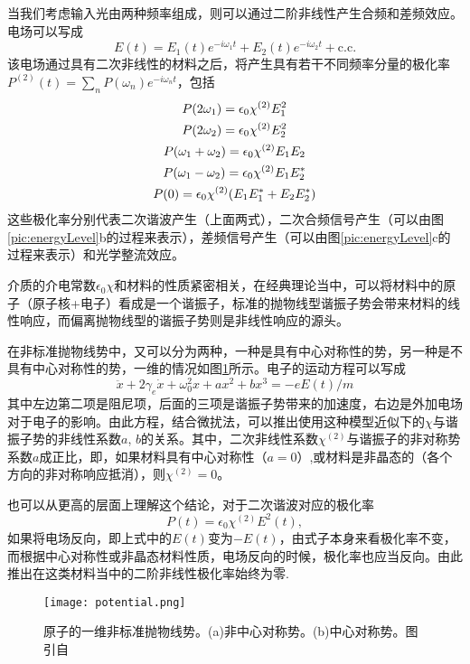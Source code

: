 当我们考虑输入光由两种频率组成，则可以通过二阶非线性产生合频和差频效应。电场可以写成
\begin{equation}
E(t) = E_1(t)e^{-i\omega_1 t}+E_2(t)e^{-i\omega_2 t}+\textrm{c.c.}
\end{equation}
该电场通过具有二次非线性的材料之后，将产生具有若干不同频率分量的极化率$P^{(2)}(t) = \sum_n P(\omega_n)e^{-i\omega_nt}$，包括
\begin{gather}
P(2\omega_1) = \epsilon_0\chi^{(2)}E_1^2  \notag \\
P(2\omega_2) = \epsilon_0\chi^{(2)}E_2^2 \notag \\
P(\omega_1+\omega_2) = \epsilon_0\chi^{(2)}E_1E_2 \\
P(\omega_1-\omega_2) = \epsilon_0\chi^{(2)}E_1E_2^* \notag \\
P(0) = \epsilon_0\chi^{(2)}(E_1E_1^*+E_2E_2^*)\notag 
\end{gather}
这些极化率分别代表二次谐波产生（上面两式），二次合频信号产生（可以由图\ref{pic:energyLevel}b的过程来表示），差频信号产生（可以由图\ref{pic:energyLevel}c的过程来表示）和光学整流效应。

介质的介电常数$\epsilon_0\chi$和材料的性质紧密相关，在经典理论当中，可以将材料中的原子（原子核+电子）看成是一个谐振子，标准的抛物线型谐振子势会带来材料的线性响应，而偏离抛物线型的谐振子势则是非线性响应的源头。

在非标准抛物线势中，又可以分为两种，一种是具有中心对称性的势，另一种是不具有中心对称性的势，一维的情况如图\ref{pic:potential}所示。电子的运动方程可以写成
\begin{equation}
\ddot{x}+2\gamma_e\dot{x}+\omega_0^2x+ax^2+bx^3 = -eE(t)/m
\end{equation}
其中左边第二项是阻尼项，后面的三项是谐振子势带来的加速度，右边是外加电场对于电子的影响。由此方程，结合微扰法，可以推出使用这种模型近似下的$\chi$与谐振子势的非线性系数$a$, $b$的关系\cite{boyd2003nonlinear}。其中，二次非线性系数$\chi^{(2)}$与谐振子的非对称势系数$a$成正比，即，如果材料具有中心对称性（$a=0$）,或材料是非晶态的（各个方向的非对称响应抵消），则$\chi^{(2)}=0$。

也可以从更高的层面上理解这个结论，对于二次谐波对应的极化率
\begin{equation}
P(t) = \epsilon_0\chi^{(2)}E^2(t),
\end{equation}
如果将电场反向，即上式中的$E(t)$变为$-E(t)$，由式子本身来看极化率不变，而根据中心对称性或非晶态材料性质，电场反向的时候，极化率也应当反向。由此推出在这类材料当中的二阶非线性极化率始终为零.

\begin{figure}
\centering
\texttt{[image: potential.png]}
\caption{原子的一维非标准抛物线势。(a)非中心对称势。(b)中心对称势。图引自\cite{boyd2003nonlinear}}
\label{pic:potential}
\end{figure}


